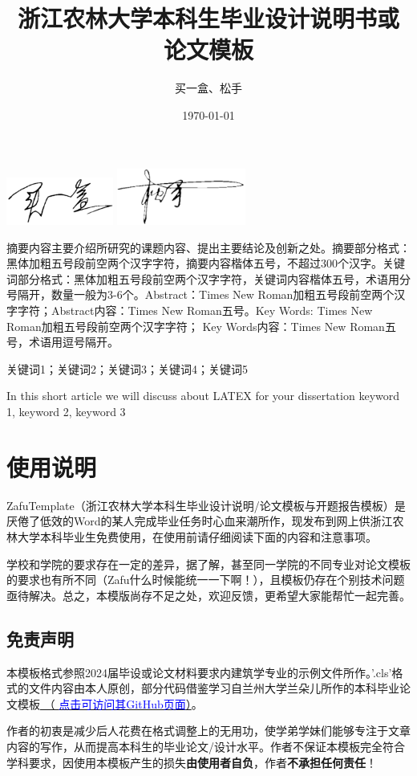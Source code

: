 \documentclass[AutoFakeBold]{ZafuThesis}
\author{买一盒、松手}%
\date{\today}%
\title{{浙江农林大学本科生}{毕业设计说明书或论文模板}}%
\begin{document}
\customCover

\setsignature
  {
  \includegraphics[width=100pt]{figures/MaiYihe}
  \includegraphics[width=120pt]{figures/SongShou}
  }
\makestatement


\customContent

\frontmatter
\ZhAbstract
{
  摘要内容主要介绍所研究的课题内容、提出主要结论及创新之处。摘要部分格式：黑体加粗五号段前空两个汉字字符，摘要内容楷体五号，不超过300个汉字。关键词部分格式：黑体加粗五号段前空两个汉字字符，关键词内容楷体五号，术语用分号隔开，数量一般为3-6个。Abstract：Times New Roman加粗五号段前空两个汉字字符；Abstract内容：Times New Roman五号。Key Words: Times New Roman加粗五号段前空两个汉字字符； Key Words内容：Times New Roman五号，术语用逗号隔开。
  
}
{关键词1；关键词2；关键词3；关键词4；关键词5}


\EnAbstract
{In this short article we will discuss about LATEX for your dissertation}
{keyword 1, keyword 2, keyword 3}


\mainmatter
\section{使用说明}
ZafuTemplate（浙江农林大学本科生毕业设计说明/论文模板与开题报告模板）是厌倦了低效的Word的某人完成毕业任务时心血来潮所作，现发布到网上供浙江农林大学本科毕业生免费使用，在使用前请仔细阅读下面的内容和注意事项。\par
学校和学院的要求存在一定的差异，据了解，甚至同一学院的不同专业对论文模板的要求也有所不同（Zafu什么时候能统一一下啊！），且模板仍存在个别技术问题亟待解决。总之，本模版尚存不足之处，欢迎反馈，更希望大家能帮忙一起完善。
\subsection{免责声明}
本模板格式参照2024届毕设或论文材料要求内建筑学专业的示例文件所作。'.cls'格式的文件内容由本人原创，部分代码借鉴学习自兰州大学兰朵儿所作的本科毕业论文模板\href{https://github.com/yuhldr/LZUThesis2020}{
  （ \textcolor{blue}{点击可访问其GitHub页面}）}。\par
作者的初衷是减少后人花费在格式调整上的无用功，使学弟学妹们能够专注于文章内容的写作，从而提高本科生的毕业论文/设计水平。作者不保证本模板完全符合学科要求，因使用本模板产生的损失{\bfseries 由使用者自负}，作者{\bfseries 不承担任何责任}！
\end{document}
